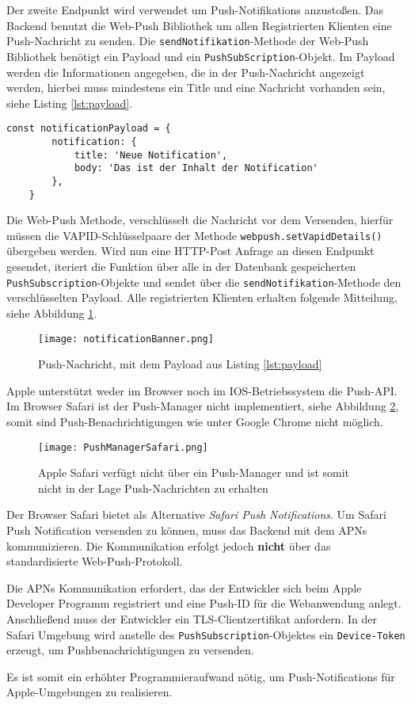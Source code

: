 Der zweite Endpunkt wird verwendet um Push-Notifikations anzustoßen. Das Backend benutzt die Web-Push Bibliothek um allen Registrierten Klienten eine Push-Nachricht zu senden.  Die \texttt{sendNotifikation}-Methode der Web-Push Bibliothek benötigt ein Payload und ein \texttt{PushSubScription}-Objekt. Im Payload werden die Informationen angegeben, die in der Push-Nachricht angezeigt werden, hierbei muss mindestens ein Title und eine Nachricht vorhanden sein, siehe Listing \ref{lst:payload}. 

\begin{lstlisting}[caption={Mindestanforderung an ein Payload, für eine Push-Nachricht}, label=lst:payload, float=!htb]
    const notificationPayload = {
        notification: {
            title: 'Neue Notification',
            body: 'Das ist der Inhalt der Notification'
        },
    }
\end{lstlisting}

Die Web-Push Methode, verschlüsselt die Nachricht vor dem Versenden, hierfür müssen die VAPID-Schlüsselpaare der Methode \texttt{webpush.setVapidDetails()} übergeben werden. 
Wird nun eine HTTP-Post Anfrage an diesen Endpunkt gesendet, iteriert die Funktion über alle in der Datenbank gespeicherten \texttt{PushSubscription}-Objekte und sendet über die \texttt{sendNotifikation}-Methode den verschlüsselten Payload. Alle registrierten Klienten erhalten folgende Mitteilung, siehe Abbildung \ref{img:notificationBanner}.

\begin{figure}[!htb]
    \centering
    \texttt{[image: notificationBanner.png]}
    \caption{Push-Nachricht, mit dem Payload aus Listing \ref{lst:payload}}
    \label{img:notificationBanner}
\end{figure}


Apple unterstützt weder im Browser noch im IOS-Betriebssystem die Push-API. Im Browser Safari ist der Push-Manager nicht implementiert, siehe Abbildung \ref{img:PushManagerBrowser}, somit sind Push-Benachrichtigungen wie unter Google Chrome nicht möglich. 

\begin{figure}[!htb]
    \centering
    \texttt{[image: PushManagerSafari.png]}
    \caption{Apple Safari verfügt nicht über ein Push-Manager und ist somit nicht in der Lage Push-Nachrichten zu erhalten}
    \label{img:PushManagerBrowser}
\end{figure}


Der Browser Safari bietet als Alternative \textit{Safari Push Notifications}. Um Safari Push Notification versenden zu können, muss das Backend mit dem \ac*{APNs} kommunizieren. Die Kommunikation erfolgt jedoch \textbf{nicht} über das standardisierte Web-Push-Protokoll.

Die APNs Kommunikation erfordert, das der Entwickler sich beim Apple Developer Programm registriert und eine Push-ID für die Webanwendung anlegt. Anschließend muss der Entwickler ein \ac*{TLS}-Clientzertifikat anfordern. In der Safari Umgebung wird anstelle des \texttt{PushSubscription}-Objektes ein \texttt{Device-Token} erzeugt, um Pushbenachrichtigungen zu versenden. 

Es ist somit ein erhöhter Programmieraufwand nötig, um Push-Notifications für Apple-Umgebungen zu realisieren.

